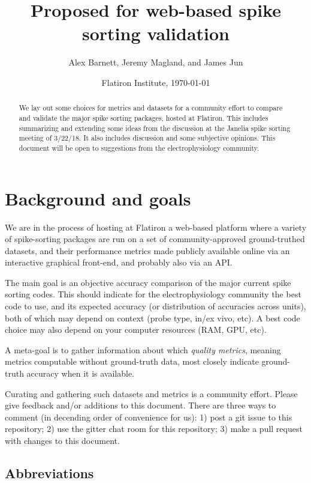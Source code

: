 \documentclass[10pt]{article}
\newcommand{\com}[1]{{\marginpar{\sffamily{\scriptsize #1}}}}
\begin{document}
\title{Proposed for web-based spike sorting validation}
\author{Alex Barnett, Jeremy Magland, and James Jun}
\date{Flatiron Institute, \today}
\maketitle
\begin{abstract}
  We lay out some choices for metrics and datasets for a community effort to
  compare and validate the major spike sorting packages, hosted at Flatiron.
  This includes summarizing and extending some ideas from the discussion at the
  Janelia spike sorting meeting of 3/22/18.
  It also includes discussion and some subjective opinions.
  This document will be open to suggestions from the electrophysiology community.
\end{abstract}

\section{Background and goals}

We are in the process of hosting at Flatiron a web-based platform where
a variety of spike-sorting packages are run on
a set of community-approved ground-truthed datasets, and their
performance metrics made publicly available online via an interactive
graphical front-end, and probably also via an API.

The main goal is an objective accuracy comparison of the major current
spike sorting codes. This should indicate for the electrophysiology community
the best code to use, and its expected accuracy (or distribution of
accuracies across units),
both of which may depend on context
(probe type, in/ex vivo, etc). A best code choice may also depend on
your computer resources (RAM, GPU, etc).

A meta-goal is to gather information about which {\em quality metrics}, meaning
metrics computable without ground-truth data, most closely indicate ground-truth
accuracy when it is available.

Curating and gathering such datasets and metrics is a community effort.
Please give feedback and/or additions to this document.
There are three ways to comment (in decending order of convenience for us):
1) post a git issue to
this repository; 2) use the gitter chat room for this repository;
3) make a pull request with changes to this document.
\com{possibly via margin comments like this}


\subsection{Abbreviations}
\end{document}
